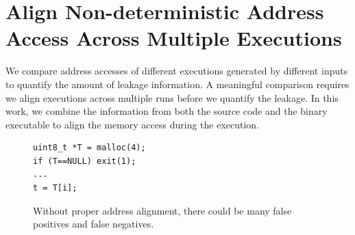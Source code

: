 \section{Align Non-deterministic Address Access Across Multiple Executions}
We compare address accesses of different executions generated by different inputs to quantify the amount of leakage information. A meaningful comparison requires we align executions across multiple runs before we quantify the leakage. In this work, we combine the information from both the source code and the binary executable to align the memory access during the execution.


\begin{figure}[h]
\begin{minipage}{0.45\linewidth}
\begin{lstlisting}[numbers=none]
uint8_t *T = malloc(4);
if (T==NULL) exit(1);
...
t = T[i];    
\end{lstlisting}
\end{minipage}
\hfill
\begin{minipage}{0.6\linewidth}
\end{minipage}
\caption{Without proper address alignment, there could be many false positives and false negatives.}\label{fig:align}
\end{figure}

